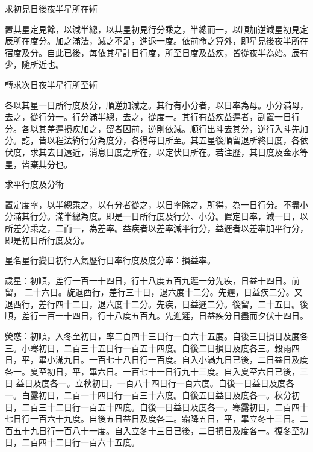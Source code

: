 \begin{pinyinscope}
 求初見日後夜半星所在術



 置其星定見餘，以減半總，以其星初見行分乘之，半總而一，以順加逆減星初見定辰所在度分。加之滿法，減之不足，進退一度。依前命之算外，即星見後夜半所在宿度及分。自此已後，每依其星計日行度，所至日度及益疾，皆從夜半為始。辰有少，隨所近也。



 轉求次日夜半星行所至術



 各以其星一日所行度及分，順逆加減之。其行有小分者，以日率為母。小分滿母，去之，從行分一。行分滿半總，去之，從度一。其行有益疾益遲者，副置一日行分。各以其差遲損疾加之，留者因前，逆則依減。順行出斗去其分，逆行入斗先加分。訖，皆以程法約行分為度分，各得每日所至。其五星後順留退所終日度，各依伏度，求其去日遠近，消息日度之所在，以定伏日所在。若注歷，其日度及金水等星，皆棄其分也。



 求平行度及分術



 置定度率，以半總乘之，以有分者從之，以日率除之，所得，為一日行分。不盡小分滿其行分。滿半總為度。即是一日所行度及行分、小分。置定日率，減一日，以所差分乘之，二而一，為差率。益疾者以差率減平行分，益遲者以差率加平行分，即是初日所行度及分。



 星名星行變日初行入氣歷行日率行度及度分率：損益率。



 歲星：初順，差行一百一十四日，行十八度五百九遲一分先疾，日益十四日。前留，
 二十六日。旋退西行，差行三十日，退六度十二分。先遲，日益疾二分。又退西行，差行四十二日，退六度十二分。先疾，日益遲二分。後留，二十五日。後順，差行一百一十四日，行十八度五百九。先進遲，日益疾分日盡而夕伏十四日。



 熒惑：初順，入冬至初日，率二百四十三日行一百六十五度。自後三日損日及度各三。小寒初日，二百三十五日行一百五十四度。自後二日損日及度各三。穀雨四日，平，畢小滿九日。一百七十八日行一百度。自入小滿九日已後，二日益日及度各一。夏至初日，平，畢六日。一百七十一日行九十三度。自入夏至六日已後，三日
 益日及度各一。立秋初日，一百八十四日行一百六度。自後一日益日及度各一。白露初日，二百一十四日行一百三十六度。自後五日益日及度各一。秋分初日，二百三十二日行一百五十四度。自後一日益日及度各一。寒露初日，二百四十七日行一百六十九度。自後五日益日及度各二。霜降五日，平，畢立冬十三日。二百五十九日行一百八十一度。自入立冬十三日已後，二日損日及度各一。復冬至初日，二百四十二日行一百六十五度。




\end{pinyinscope}

